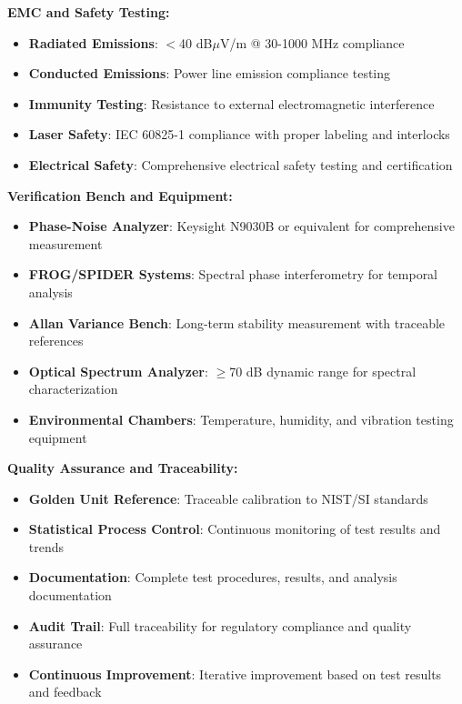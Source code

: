 \documentclass[11pt,a4paper]{article}
\begin{document}
\textbf{EMC and Safety Testing:}
\begin{itemize}
\item \textbf{Radiated Emissions}: $<$40 dB$\mu$V/m @ 30-1000 MHz compliance
\item \textbf{Conducted Emissions}: Power line emission compliance testing
\item \textbf{Immunity Testing}: Resistance to external electromagnetic interference
\item \textbf{Laser Safety}: IEC 60825-1 compliance with proper labeling and interlocks
\item \textbf{Electrical Safety}: Comprehensive electrical safety testing and certification
\end{itemize}

\textbf{Verification Bench and Equipment:}
\begin{itemize}
\item \textbf{Phase-Noise Analyzer}: Keysight N9030B or equivalent for comprehensive measurement
\item \textbf{FROG/SPIDER Systems}: Spectral phase interferometry for temporal analysis
\item \textbf{Allan Variance Bench}: Long-term stability measurement with traceable references
\item \textbf{Optical Spectrum Analyzer}: $\geq$70 dB dynamic range for spectral characterization
\item \textbf{Environmental Chambers}: Temperature, humidity, and vibration testing equipment
\end{itemize}

\textbf{Quality Assurance and Traceability:}
\begin{itemize}
\item \textbf{Golden Unit Reference}: Traceable calibration to NIST/SI standards
\item \textbf{Statistical Process Control}: Continuous monitoring of test results and trends
\item \textbf{Documentation}: Complete test procedures, results, and analysis documentation
\item \textbf{Audit Trail}: Full traceability for regulatory compliance and quality assurance
\item \textbf{Continuous Improvement}: Iterative improvement based on test results and feedback
\end{itemize}
\end{document}
